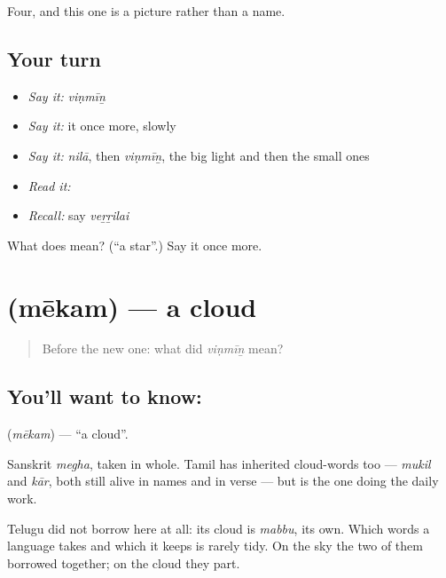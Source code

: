 \begin{grammarlens}[title={What you've built}]
Four, and this one is a picture rather than a name.
\end{grammarlens}

\subsection*{Your turn}
\begin{itemize}
\raggedright
  \item \emph{Say it:} \emph{viṇmīṉ}
  \item \emph{Say it:} it once more, slowly
  \item \emph{Say it:} \emph{nilā}, then \emph{viṇmīṉ}, the big light and then the small ones
  \item \emph{Read it:} \textbf{}
  \item \emph{Recall:} say \emph{veṟṟilai}
\end{itemize}

\begin{tcolorbox}[breakable,colback=teal!4,colframe=teal!35!black,title={Before you move on}]
What does  mean? (\textquotedblleft{}a star\textquotedblright{}.) Say it once more.
\end{tcolorbox}
\section[\texorpdfstring{\ta{மேகம்} (mēkam)}{மேகம் (mēkam)}]{ (mēkam) — a cloud}

\label{lesson:TA-C51-cloud}



\begin{quote}
Before the new one: what did \emph{viṇmīṉ} mean?
\end{quote}

\subsection*{You'll want to know: }
\textbf{} (\emph{mēkam}) — \textquotedblleft{}a cloud\textquotedblright{}.

Sanskrit \emph{megha}, taken in whole. Tamil has inherited cloud-words too — \emph{mukil} and \emph{kār}, both still alive in names and in verse — but  is the one doing the daily work.

Telugu did not borrow here at all: its cloud is \emph{mabbu}, its own. Which words a language takes and which it keeps is rarely tidy. On the sky the two of them borrowed together; on the cloud they part.

